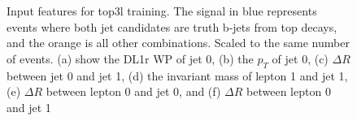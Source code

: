 \begin{figure}[H]
    \centering
    \\
    \\
    \caption{Input features for top3l training. The signal in blue represents events where both jet candidates are truth b-jets from top decays, and the orange is all other combinations. Scaled to the same number of events. (a) show the DL1r WP of jet 0, (b) the $p_T$ of jet 0, (c) $\Delta R$ between jet 0 and jet 1, (d) the invariant mass of lepton 1 and jet 1, (e) $\Delta R$ between lepton 0 and jet 0, and (f) $\Delta R$ between lepton 0 and jet 1}
    \label{fig:features_top3l}
\end{figure}



